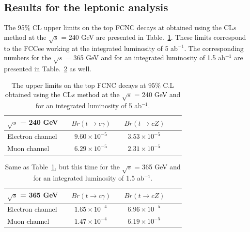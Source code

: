 \documentclass[11pt,onecolumn,english,showpacs,preprintnumbers,amsmath,amssymb,floatfix,nofootinbib]{revtex4-1}
\def\to{\rightarrow}
\begin{document}
\subsection{Results for the leptonic analysis}\label{leptonic-analysis}

 
The 95\% CL upper limits on the top FCNC decays at obtained using the CL$s$ method
at the $\sqrt {s}$ = 240 GeV are presented in Table.~\ref{limits-240}.
These limits correspond to the FCCee working at the integrated luminosity of 5 ab$^{-1}$.
The corresponding numbers for the $\sqrt {s}$ = 365 GeV and for an 
integrated luminosity of 1.5 ab$^{-1}$ are presented in Table.~\ref{limits-365} as well.




\begin{table}[htbp]
\begin{center}
\begin{tabular}{l|c c c c }  \hline
$\sqrt {s}$ = 240 GeV  &  ~  $Br (t \to c \gamma )$       &  ~ $Br (t \to c Z)$      \\  \hline
Electron channel       &  ~  $9.60 \times 10^{-5}$        & ~ $3.53 \times 10^{-5}$       \\    
Muon channel           &  ~  $6.29 \times 10^{-5}$        & ~ $2.31 \times 10^{-5}$     \\   \hline  \hline
\end{tabular}
\end{center}
\caption{The upper limits on the top FCNC decays at $95\%$ C.L obtained using the CL$s$ method
at the $\sqrt {s}$ = 240 GeV and for an integrated luminosity of 5 ab$^{-1}$.}
\label{limits-240}
\end{table}




\begin{table}[htbp]
\begin{center}
\begin{tabular}{l|c c c c }  \hline
$\sqrt {s}$ = 365 GeV  &  ~  $Br (t \to c \gamma )$       &  ~ $Br (t \to c Z)$      \\  \hline
Electron channel       &  ~  $1.65 \times 10^{-4}$        & ~ $6.96 \times 10^{-5}$       \\    
Muon channel           &  ~  $1.47 \times 10^{-4}$        & ~ $6.19 \times 10^{-5}$    \\   \hline  \hline
\end{tabular}
\end{center}
\caption{Same as Table~\ref{limits-240}, but this time for the 
$\sqrt {s}$ = 365 GeV and for an integrated luminosity of 1.5 ab$^{-1}$.}
\label{limits-365}
\end{table}
\end{document}
